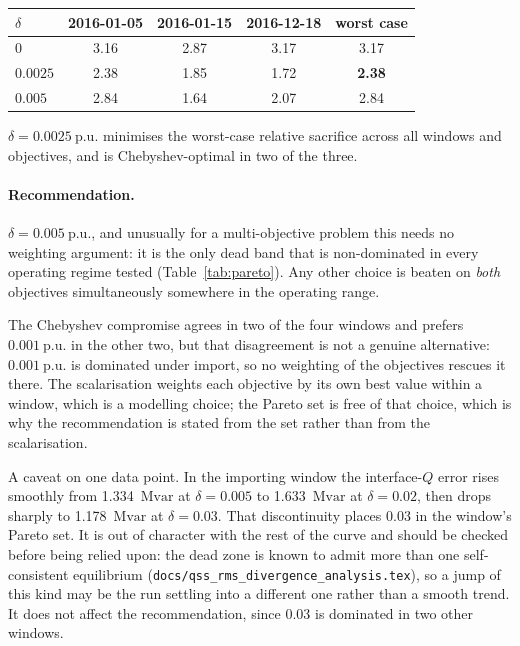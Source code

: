 \documentclass[11pt,a4paper]{article}
\newcommand{\pu}{\ensuremath{\mathrm{p.u.}}}
\newcommand{\Mvar}{\ensuremath{\mathrm{Mvar}}}
\newcommand{\dz}{\ensuremath{\delta}}
\begin{document}
\begin{center}
\begin{tabular}{lcccc}
\toprule
$\dz$ & 2016-01-05 & 2016-01-15 & 2016-12-18 & worst case \\
\midrule
$0$      & 3.16 & 2.87 & 3.17 & 3.17 \\
$0.0025$ & 2.38 & 1.85 & 1.72 & \textbf{2.38} \\
$0.005$  & 2.84 & 1.64 & 2.07 & 2.84 \\
\bottomrule
\end{tabular}
\end{center}

$\dz = \SI{0.0025}{\pu}$ minimises the worst-case relative sacrifice across all
windows and objectives, and is Chebyshev-optimal in two of the three.

\paragraph{Recommendation.} $\dz = \SI{0.005}{\pu}$, and unusually for a
multi-objective problem this needs no weighting argument: it is the only dead
band that is non-dominated in every operating regime tested
(Table~\ref{tab:pareto}). Any other choice is beaten on \emph{both} objectives
simultaneously somewhere in the operating range.

The Chebyshev compromise agrees in two of the four windows and prefers
$\SI{0.001}{\pu}$ in the other two, but that disagreement is not a genuine
alternative: $\SI{0.001}{\pu}$ is dominated under import, so no weighting of the
objectives rescues it there. The scalarisation weights each objective by its own
best value within a window, which is a modelling choice; the Pareto set is free
of that choice, which is why the recommendation is stated from the set rather
than from the scalarisation.

A caveat on one data point. In the importing window the interface-$Q$ error
rises smoothly from \SI{1.334}{\Mvar} at $\dz = 0.005$ to \SI{1.633}{\Mvar} at
$\dz = 0.02$, then drops sharply to \SI{1.178}{\Mvar} at $\dz = 0.03$. That
discontinuity places $0.03$ in the window's Pareto set. It is out of character
with the rest of the curve and should be checked before being relied upon: the
dead zone is known to admit more than one self-consistent equilibrium
(\texttt{docs/qss\_rms\_divergence\_analysis.tex}), so a jump of this kind may
be the run settling into a different one rather than a smooth trend. It does not
affect the recommendation, since $0.03$ is dominated in two other windows.
\end{document}
